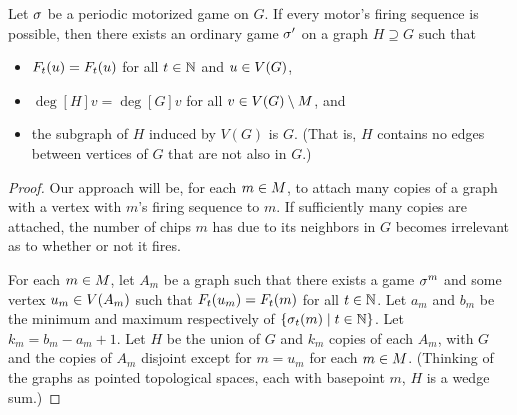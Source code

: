 \begin{thm} \label{natMotors}
Let $\s$ be a periodic motorized game on $G$. If every motor's firing sequence
is possible, then there exists an ordinary game $\s'$ on a graph $H \supseteq
G$ such that
\begin{itemize}
\item $\firing[\s']{u}{t} = \firing{u}{t}$ for all $t \in \nats$ and $u \in
  \V$,
\item $\deg[H]{v} = \deg[G]{v}$ for all $v \in \V \setminus \mots$, and
\item the subgraph of $H$ induced by $V(G)$ is $G$. (That is, $H$ contains no
  edges between vertices of $G$ that are not also in $G$.)
\end{itemize}
\end{thm}

\begin{proof}
Our approach will be, for each $m \in \mots$, to attach many copies of a graph
with a vertex with $m$'s firing sequence to $m$. If sufficiently many copies
are attached, the number of chips $m$ has due to its neighbors in $G$ becomes
irrelevant as to whether or not it fires.

For each $m \in \mots$, let $A_m$ be a graph such that there exists a game
$\s^m$ and some vertex $u _m\in \V[A_m]$ such that $\firing[\s^m]{u_m}{t} =
\firing{m}{t}$ for all $t \in \nats$. Let $a_m$ and $b_m$ be the minimum and
maximum respectively of $\set{\chips{m}{t}}{t \in \nats}$. Let $k_m = b_m - a_m
+ 1$. Let $H$ be the union of $G$ and $k_m$ copies of each $A_m$, with $G$ and
the copies of $A_m$ disjoint except for $m = u_m$ for each $m \in
\mots$. (Thinking of the graphs as pointed topological spaces, each with basepoint
$m$, $H$ is a wedge sum.)


\end{proof}
